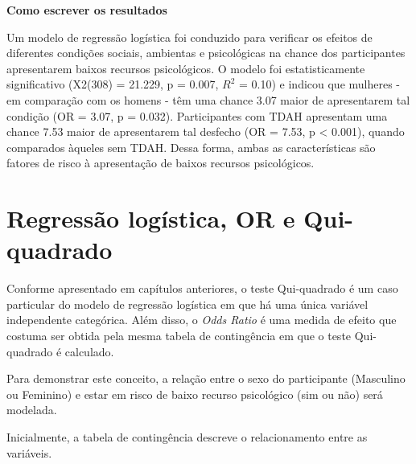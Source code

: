 \documentclass[
]{book}
\begin{document}
\textbf{Como escrever os resultados}

Um modelo de regressão logística foi conduzido para verificar os efeitos de diferentes condições sociais, ambientas e psicológicas na chance dos participantes apresentarem baixos recursos psicológicos. O modelo foi estatisticamente significativo (X2(308) = 21.229, p = 0.007, \(R^2\) = 0.10) e indicou que mulheres - em comparação com os homens - têm uma chance 3.07 maior de apresentarem tal condição (OR = 3.07, p = 0.032). Participantes com TDAH apresentam uma chance 7.53 maior de apresentarem tal desfecho (OR = 7.53, p \textless{} 0.001), quando comparados àqueles sem TDAH. Dessa forma, ambas as características são fatores de risco à apresentação de baixos recursos psicológicos.

\hypertarget{regressuxe3o-loguxedstica-or-e-qui-quadrado}{%
\section{Regressão logística, OR e Qui-quadrado}\label{regressuxe3o-loguxedstica-or-e-qui-quadrado}}

Conforme apresentado em capítulos anteriores, o teste Qui-quadrado é um caso particular do modelo de regressão logística em que há uma única variável independente categórica. Além disso, o \emph{Odds Ratio} é uma medida de efeito que costuma ser obtida pela mesma tabela de contingência em que o teste Qui-quadrado é calculado.

Para demonstrar este conceito, a relação entre o sexo do participante (Masculino ou Feminino) e estar em risco de baixo recurso psicológico (sim ou não) será modelada.

Inicialmente, a tabela de contingência descreve o relacionamento entre as variáveis.
\end{document}
